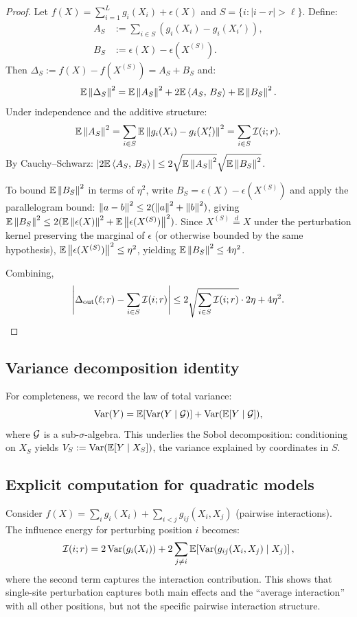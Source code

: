 \begin{proof}
Let $f(X)=\sum_{i=1}^L g_i(X_i) + \epsilon(X)$ and $S = \{i:|i-r|>\ell\}$. Define:
\begin{align*}
A_S &:= \sum_{i\in S}(g_i(X_i)-g_i(X_i')), \\
B_S &:= \epsilon(X)-\epsilon(X^{(S)}).
\end{align*}
Then $\Delta_S := f(X) - f(X^{(S)}) = A_S + B_S$ and:
\[
\mathbb{E}\left\lVert \Delta_S \right\rVert^2 = \mathbb{E}\left\lVert A_S \right\rVert^2 + 2\mathbb{E}\left\langle A_S,\, B_S \right\rangle + \mathbb{E}\left\lVert B_S \right\rVert^2.
\]
Under independence and the additive structure:
\[
\mathbb{E}\left\lVert A_S \right\rVert^2 = \sum_{i\in S}\mathbb{E}\left\lVert g_i(X_i)-g_i(X_i') \right\rVert^2 = \sum_{i\in S} \mathcal{I}(i;r).
\]
By Cauchy--Schwarz: $|2\mathbb{E}\left\langle A_S,\, B_S \right\rangle| \le 2\sqrt{\mathbb{E}\left\lVert A_S \right\rVert^2}\sqrt{\mathbb{E}\left\lVert B_S \right\rVert^2}$.

To bound $\mathbb{E}\left\lVert B_S \right\rVert^2$ in terms of $\eta^2$, write $B_S = \epsilon(X) - \epsilon(X^{(S)})$ and apply the parallelogram bound: $\left\lVert a-b \right\rVert^2 \le 2(\left\lVert a \right\rVert^2 + \left\lVert b \right\rVert^2)$, giving $\mathbb{E}\left\lVert B_S \right\rVert^2 \le 2(\mathbb{E}\left\lVert \epsilon(X) \right\rVert^2 + \mathbb{E}\left\lVert \epsilon(X^{(S)}) \right\rVert^2)$. Since $X^{(S)} \stackrel{d}{=} X$ under the perturbation kernel preserving the marginal of $\epsilon$ (or otherwise bounded by the same hypothesis), $\mathbb{E}\left\lVert \epsilon(X^{(S)}) \right\rVert^2 \le \eta^2$, yielding $\mathbb{E}\left\lVert B_S \right\rVert^2 \le 4\eta^2$.

Combining,
\[
\left|\Delta_{\mathrm{out}}(\ell;r) - \sum_{i\in S}\mathcal{I}(i;r)\right| \le 2\sqrt{\sum_{i\in S}\mathcal{I}(i;r)} \cdot 2\eta + 4\eta^2.
\]
\end{proof}

\subsection{Variance decomposition identity}

For completeness, we record the law of total variance:
\[
\operatorname{Var}(Y) = \mathbb{E}[\operatorname{Var}(Y\mid \mathcal{G})] + \operatorname{Var}(\mathbb{E}[Y\mid \mathcal{G}]),
\]
where $\mathcal{G}$ is a sub-$\sigma$-algebra. This underlies the Sobol decomposition: conditioning on $X_S$ yields $V_S := \operatorname{Var}(\mathbb{E}[Y\mid X_S])$, the variance explained by coordinates in $S$.

\subsection{Explicit computation for quadratic models}

Consider $f(X) = \sum_i g_i(X_i) + \sum_{i<j} g_{ij}(X_i, X_j)$ (pairwise interactions). The influence energy for perturbing position $i$ becomes:
\[
\mathcal{I}(i;r) = 2\operatorname{Var}(g_i(X_i)) + 2\sum_{j \neq i} \mathbb{E}\!\left[\operatorname{Var}(g_{ij}(X_i, X_j) \mid X_j)\right],
\]
where the second term captures the interaction contribution. This shows that single-site perturbation captures both main effects and the ``average interaction'' with all other positions, but not the specific pairwise interaction structure.

